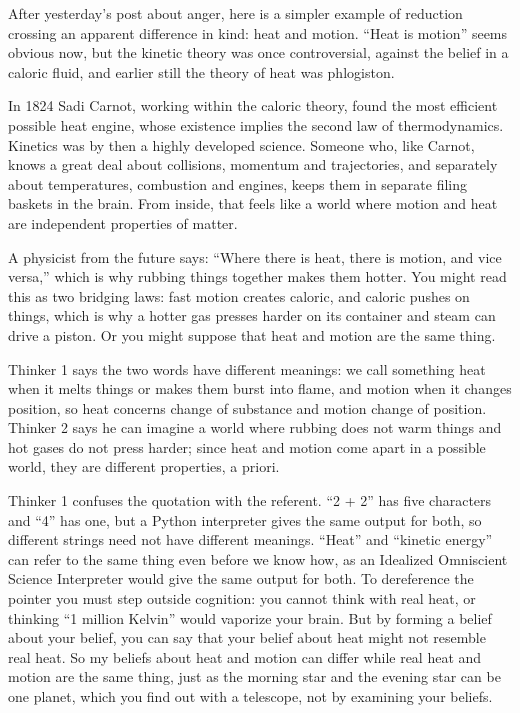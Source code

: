 
After yesterday's post about anger, here is a simpler example of reduction crossing an apparent difference in kind: heat and motion. ``Heat is motion'' seems obvious now, but the kinetic theory was once controversial, against the belief in a caloric fluid, and earlier still the theory of heat was phlogiston. 

In 1824 Sadi Carnot, working within the caloric theory, found the most efficient possible heat engine, whose existence implies the second law of thermodynamics. Kinetics was by then a highly developed science. Someone who, like Carnot, knows a great deal about collisions, momentum and trajectories, and separately about temperatures, combustion and engines, keeps them in separate filing baskets in the brain. From inside, that feels like a world where motion and heat are independent properties of matter.

A physicist from the future says: ``Where there is heat, there is motion, and vice versa,'' which is why rubbing things together makes them hotter. You might read this as two bridging laws: fast motion creates caloric, and caloric pushes on things, which is why a hotter gas presses harder on its container and steam can drive a piston.  Or you might suppose that heat and motion are the same thing. 

Thinker 1 says the two words have different meanings: we call something heat when it melts things or makes them burst into flame, and motion when it changes position, so heat concerns change of substance and motion change of position. Thinker 2 says he can imagine a world where rubbing does not warm things and hot gases do not press harder; since heat and motion come apart in a possible world, they are different properties, a priori.

Thinker 1 confuses the quotation with the referent. ``2 + 2'' has five characters and ``4'' has one, but a Python interpreter gives the same output for both, so different strings need not have different meanings. ``Heat'' and ``kinetic energy'' can refer to the same thing even before we know how, as an Idealized Omniscient Science Interpreter would give the same output for both. To dereference the pointer you must step outside cognition: you cannot think with real heat, or thinking ``1 million Kelvin'' would vaporize your brain. But by forming a belief about your belief, you can say that your belief about heat might not resemble real heat. So my beliefs about heat and motion can differ while real heat and motion are the same thing, just as the morning star and the evening star can be one planet, which you find out with a telescope, not by examining your beliefs.

